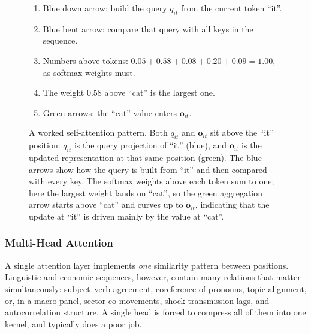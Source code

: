 \documentclass[11pt,a4paper]{report}
\begin{document}
\begin{figure}[ht]
\begin{minipage}[c]{0.31\textwidth}
\begin{enumerate}[leftmargin=*, itemsep=2pt]
\item Blue down arrow: build the query $q_{\textit{it}}$ from the current token ``it''.
\item Blue bent arrow: compare that query with all keys in the sequence.
\item Numbers above tokens: $0.05 + 0.58 + 0.08 + 0.20 + 0.09 = 1.00$, as softmax weights must.
\item The weight $0.58$ above ``cat'' is the largest one.
\item Green arrows: the ``cat'' value enters $\bm{o}_{\textit{it}}$.
\end{enumerate}
\end{minipage}
\caption{A worked self-attention pattern.  Both $q_{\textit{it}}$ and $\bm{o}_{\textit{it}}$ sit above the ``it'' position: $q_{\textit{it}}$ is the query projection of ``it'' (blue), and $\bm{o}_{\textit{it}}$ is the updated representation at that same position (green).  The blue arrows show how the query is built from ``it'' and then compared with every key.  The softmax weights above each token sum to one; here the largest weight lands on ``cat'', so the green aggregation arrow starts above ``cat'' and curves up to $\bm{o}_{\textit{it}}$, indicating that the update at ``it'' is driven mainly by the value at ``cat''.}
\label{fig:attention}
\end{figure}

\subsubsection{Multi-Head Attention}
\label{sec:mha}

A single attention layer implements \emph{one} similarity pattern between positions.  Linguistic and economic sequences, however, contain many relations that matter simultaneously: subject--verb agreement, coreference of pronouns, topic alignment, or, in a macro panel, sector co-movements, shock transmission lags, and autocorrelation structure.  A single head is forced to compress all of them into one kernel, and typically does a poor job.
\end{document}

